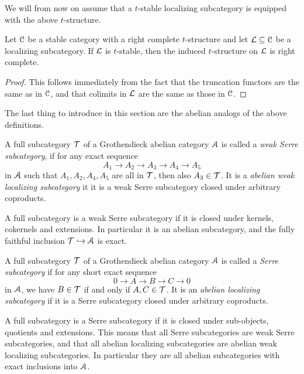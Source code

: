 We will from now on assume that a $t$-stable localizing subcategory is equipped with the above $t$-structure. 

\begin{proposition}
    \label{ch4:prop:induced-t-structure-on-stable-localizing}
    Let $\EuScript{C}$ be a stable category with a right complete $t$-structure and let $\mathcal{L}\subseteq \EuScript{C}$ be a localizing subcategory. If $\mathcal{L}$ is $t$-stable, then the induced $t$-structure on $\mathcal{L}$ is right complete.  
\end{proposition}
\begin{proof}
    This follows immediately from the fact that the truncation functors are the same as in $\EuScript{C}$, and that colimits in $\mathcal{L}$ are the same as those in $\EuScript{C}$. 
\end{proof}

The last thing to introduce in this section are the abelian analogs of the above definitions. 

\begin{definition}
    A full subcategory $\mathcal{T}$ of a Grothendieck abelian category $\EuScript{A}$ is called a \emph{weak Serre subcategory}, if for any exact sequence 
    \[A_1 \to A_2 \to A_3 \to A_4 \to A_5\]
    in $\EuScript{A}$ such that $A_1, A_2, A_4, A_5$ are all in $\mathcal{T}$, then also $A_3 \in \mathcal{T}$. It is a \emph{abelian weak localizing subcategory} it it is a weak Serre subcategory closed under arbitrary coproducts. 
\end{definition}

\begin{remark}
    A full subcategory is a weak Serre subcategory if it is closed under kernels, cokernels and extensions. In particular it is an abelian subcategory, and the fully faithful inclusion $\mathcal{T}\hookrightarrow \EuScript{A}$ is exact. 
\end{remark}

\begin{definition}
    A full subcategory $\mathcal{T}$ of a Grothendieck abelian category $\EuScript{A}$ is called a \emph{Serre subcategory} if for any short exact sequence 
    \[0\to A\to B\to C\to 0\]
    in $\EuScript{A}$, we have $B\in \mathcal{T}$ if and only if $A, C \in \mathcal{T}$. It is an \emph{abelian localizing subcategory} if it is a Serre subcategory closed under arbitrary coproducts. 
\end{definition}

\begin{remark}
    A full subcategory is a Serre subcategory if it is closed under sub-objects, quotients and extensions. This means that all Serre subcategories are weak Serre subcategories, and that all abelian localizing subcategories are abelian weak localizing subcategories. In particular they are all abelian subcategories with exact inclusions into $\EuScript{A}$. 
\end{remark}

